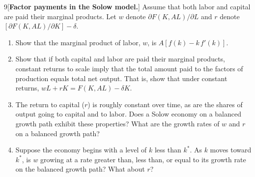 \begin{problem}{9}[\textbf{Factor payments in the Solow model.}]
Assume that both labor and capital are paid their marginal products. Let \(w\) denote
\(\partial F\left(K,AL\right)/\partial L\) and \(r\) denote
\(\left[\partial F\left(K,AL\right)/\partial K\right]-\delta\).
\begin{enumerate}[label=(\alph*)]
    \item Show that the marginal product of labor, \(w\), is \(A\left[f\left(k\right)-k\,f'\left(k\right)\right]\).
    \item Show that if both capital and labor are paid their marginal products, constant returns
    to scale imply that the total amount paid to the factors of production equals total net output.
    That is, show that under constant returns, \(wL+rK=F\left(K,AL\right)-\delta K\).
    \item The return to capital (\(r\)) is roughly constant over time, as are the shares of output
    going to capital and to labor. Does a Solow economy on a balanced growth path exhibit these
    properties? What are the growth rates of \(w\) and \(r\) on a balanced growth path?
    \item Suppose the economy begins with a level of \(k\) less than \(k^*\). As \(k\) moves
    toward \(k^*\), is \(w\) growing at a rate greater than, less than, or equal to its growth
    rate on the balanced growth path? What about \(r\)?
\end{enumerate}
\end{problem}

